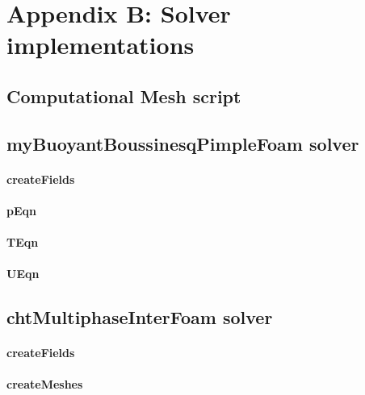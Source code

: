 
\chapter{Appendix B: Solver implementations} %

\label{AppendixB} 
\section{Computational Mesh script}
\label{mesh script}

\section{myBuoyantBoussinesqPimpleFoam solver}

\subsubsection*{createFields}

\subsubsection*{pEqn}

\subsubsection*{TEqn}

\subsubsection*{UEqn}

\section{chtMultiphaseInterFoam solver}
\label{chtMultiphaseInterFoam}
\subsubsection*{createFields}

\subsubsection*{createMeshes}

